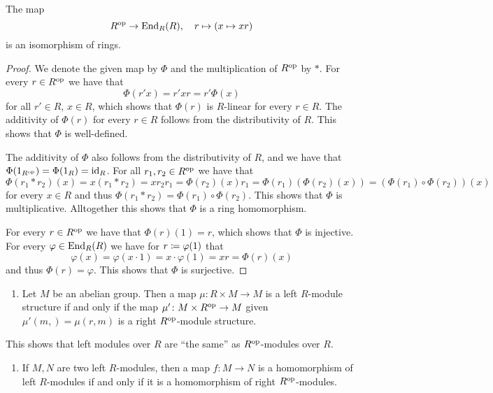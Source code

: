 \begin{lemma}
  \label{lemma: End_R(R) = Rop}
  The map
  \[
              R^{\mathrm{op}}
    \to       \operatorname{End}_R(R),
    \quad     r
    \mapsto   (x \mapsto xr)
  \]
  is an isomorphism of rings.
\end{lemma}


\begin{proof}
  We denote the given map by $\Phi$ and the multiplication of $R^{\mathrm{op}}$ by $*$.
  For every $r \in R^{\mathrm{op}}$ we have that
  \[
      \Phi(r'x)
    = r' x r
    = r' \Phi(x)
  \]
  for all $r' \in R$, $x \in R$, which shows that $\Phi(r)$ is $R$-linear for every $r \in R$.
  The additivity of $\Phi(r)$ for every $r \in R$ follows from the distributivity of $R$.
  This shows that $\Phi$ is well-defined.
  
  The additivity of $\Phi$ also follows from the distributivity of $R$, and we have that $\Phi(1_{R^{\mathrm{op}}}) = \Phi(1_R) = \operatorname{id}_R$.
  For all $r_1, r_2 \in R^{\mathrm{op}}$ we have that
  \[
      \Phi(r_1 * r_2)(x)
    = x (r_1 * r_2)
    = x r_2 r_1
    = \Phi(r_2)(x) r_1
    = \Phi(r_1)(\Phi(r_2)(x))
    = (\Phi(r_1) \circ \Phi(r_2))(x)
  \]
  for every $x \in R$ and thus $\Phi(r_1 * r_2) = \Phi(r_1) \circ \Phi(r_2)$.
  This shows that $\Phi$ is multiplicative.
  Alltogether this shows that $\Phi$ is a ring homomorphism.
  
  For every $r \in R^{\mathrm{op}}$ we have that $\Phi(r)(1) = r$, which shows that $\Phi$ is injective.
  For every $\varphi \in \operatorname{End}_R(R)$ we have for $r \coloneqq \varphi(1)$ that
  \[
      \varphi(x)
    = \varphi(x \cdot 1)
    = x \cdot \varphi(1)
    = x r
    = \Phi(r)(x)
  \]
  and thus $\Phi(r) = \varphi$.
  This shows that $\Phi$ is surjective.
\end{proof}


\begin{proposition}
  \leavevmode
  \begin{enumerate}
    \item
      Let $M$ be an abelian group.
      Then a map $\mu \colon R \times M \to M$ is a left $R$-module structure if and only if the map $\mu' \colon  M \times R^{\mathrm{op}} \to M$ given $\mu'(m,) = \mu(r,m)$ is a right $R^{\mathrm{op}}$-module structure.
  \end{enumerate}
  This shows that left modules over $R$ are \enquote{the same} as $R^{\mathrm{op}}$-modules over $R$.
  \begin{enumerate}[resume]
    \item
      If $M, N$ are two left $R$-modules, then a map $f \colon M \to N$ is a homomorphism of left $R$-modules if and only if it is a homomorphism of right $R^{\mathrm{op}}$-modules.
  \end{enumerate}
\end{proposition}


